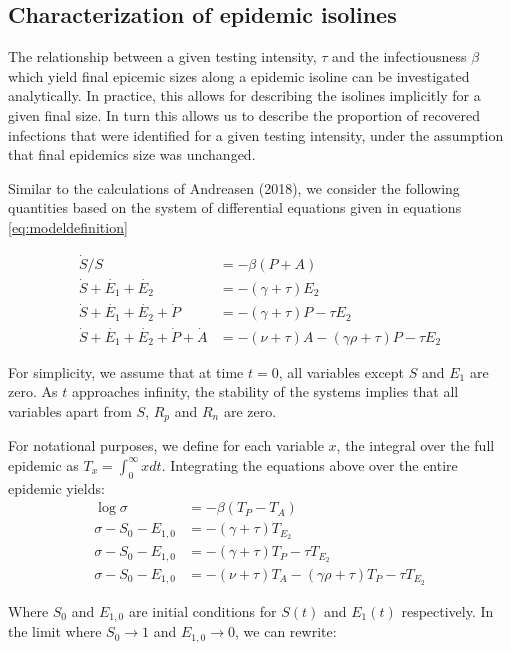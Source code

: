 \documentclass[10pt,a4paper]{article}
\begin{document}
\subsection{Characterization of epidemic isolines}
The relationship between a given testing intensity, $\tau$ and the infectiousness $\beta$ which yield final epicemic sizes along a epidemic isoline can be investigated analytically.
In practice, this allows for describing the isolines implicitly for a given final size.
In turn this allows us to describe the proportion of recovered infections that were identified for a given testing intensity, under the assumption that final epidemics size was unchanged.

Similar to the calculations of Andreasen (2018), we consider the following quantities based on the system of differential equations given in equations \eqref{eq:modeldefinition}

\begin{align}
    \dot{S} / S &= - \beta (P + A) \\
    \dot{S} + \dot{E_1} + \dot{E_2} &= -(\gamma + \tau) E_2 \\
    \dot{S} + \dot{E_1} + \dot{E_2} +\dot{P} &= -(\gamma + \tau) P - \tau E_2 \\
    \dot{S} + \dot{E_1} + \dot{E_2} + \dot{P} + \dot{A} &= -(\nu + \tau) A -(\gamma \rho + \tau) P - \tau E_2 
\end{align}

For simplicity, we assume that at time $t=0$, all variables except $S$ and $E_1$ are zero. 
As $t$ approaches infinity, the stability of the systems implies that all variables apart from $S$, $R_p$ and $R_n$ are zero. 

For notational purposes, we define for each variable $x$, the integral over the full epidemic as $T_x = \int_0^{\infty} x dt$.
Integrating the equations above over the entire epidemic yields:
\begin{align}
    \log{\sigma} &= - \beta (T_P - T_A) \\
    \sigma - S_0 - E_{1,0} &= - (\gamma + \tau) T_{E_2} \\
    \sigma - S_0 - E_{1,0} &= -(\gamma + \tau) T_P - \tau T_{E_2} \\
    \sigma - S_0 - E_{1,0} &= -(\nu + \tau) T_A -(\gamma \rho + \tau) T_P - \tau T_{E_2} 
\end{align}

Where $S_0$ and $E_{1,0}$ are initial conditions for $S(t)$ and $E_1(t)$ respectively. 
In the limit where $S_0 \rightarrow 1$ and $E_{1,0} \rightarrow 0$, we can rewrite:
\end{document}
